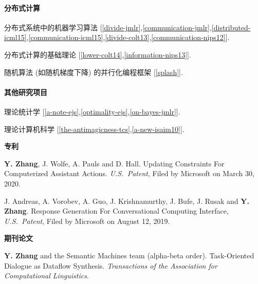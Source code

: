\documentclass{res}
\newenvironment{my_item}{
\begin{itemize}
  \setlength{\itemsep}{0pt}
  \setlength{\parskip}{0pt}
  \setlength{\parsep}{0pt}}
{\end{itemize}
}
\begin{document}
\begin{resume}
\vspace{-5pt}
\paragraph{分布式计算}
\begin{my_item}
\item 分布式系统中的机器学习算法 [\ref{divide-jmlr},\ref{communication-jmlr},\ref{distributed-icml15},\ref{communication-icml15},\ref{divide-colt13},\ref{communication-nips12}].
\item 分布式计算的基础理论 [\ref{lower-colt14},\ref{information-nips13}].
\item 随机算法 (如随机梯度下降) 的并行化编程框架 [\ref{splash}].
\end{my_item}

\vspace{-5pt}
\paragraph{其他研究项目}
\begin{my_item}
\item 理论统计学 [\ref{a-note-ejs},\ref{optimality-ejs},\ref{on-bayes-jmlr}].
\item 理论计算机科学 [\ref{the-antimagicness-tcs},\ref{a-new-isaim10}].
\end{my_item}

{\bf\Large 专利}
\vspace{5pt}

\begin{enumerate}[label={[P\arabic*]}, ref={P\arabic*}]
\item \label{updating-patent} \textbf{Y. Zhang}, J. Wolfe, A. Pauls and D. Hall. Updating Constraints For Computerized Assistant Actions. \emph{U.S.~Patent}, Filed by Microsoft on March 30, 2020.
\item \label{reponse-patent} J. Andreas, A. Vorobev, A. Guo, J. Krishnamurthy, J. Bufe, J. Rusak and \textbf{Y. Zhang}. Response Generation For Conversational Computing Interface, \emph{U.S.~Patent}, Filed by Microsoft on August 12, 2019.
\end{enumerate}

{\bf\Large 期刊论文}
\vspace{5pt}

\begin{enumerate}[label={[J\arabic*]}, ref={J\arabic*}]

\item \textbf{Y. Zhang} and the Semantic Machines team (alpha-beta order). Task-Oriented Dialogue as Dataflow Synthesis.
\emph{Transactions of the Association for Computational Linguistics}.\label{task-tacl}


\end{enumerate}
\end{resume}
\end{document}
